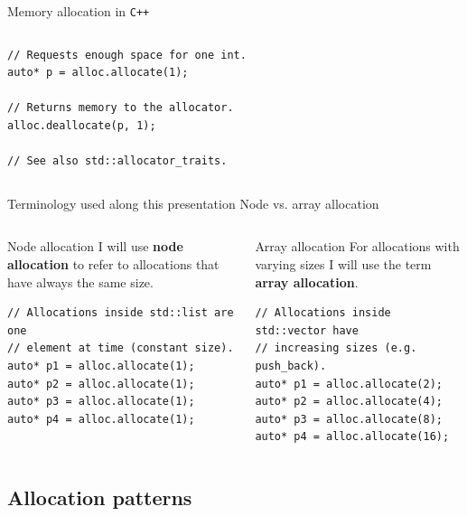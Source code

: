 \documentclass[10pt,aspectratio=169]{beamer}
\begin{document}
\begin{frame}[fragile]{Memory allocation in \texttt{C++}}
\begin{columns}
\begin{column}[t]{0.45\textwidth}
\begin{lstlisting}
// Requests enough space for one int.
auto* p = alloc.allocate(1);

// Returns memory to the allocator.
alloc.deallocate(p, 1);

// See also std::allocator_traits.
\end{lstlisting}
\end{column}
\end{columns}
\end{frame}

\begin{frame}[fragile]
{Terminology used along this presentation}
{Node vs. array allocation}
\begin{columns}
\begin{column}{0.45\textwidth}

\begin{block} {Node allocation}
I will use {\bf \color{alertc} node allocation} to refer to
allocations that have always the same size.
\end{block}
\vspace{0.5cm}
\begin{lstlisting}
// Allocations inside std::list are one
// element at time (constant size).
auto* p1 = alloc.allocate(1);
auto* p2 = alloc.allocate(1);
auto* p3 = alloc.allocate(1);
auto* p4 = alloc.allocate(1);
\end{lstlisting}

\end{column}

\begin{column}{0.45\textwidth}
\begin{block} {Array allocation}
For allocations with varying sizes I will use the term {\bf \color{alertc} array allocation}.
\end{block}
\vspace{0.5cm}
\begin{lstlisting}
// Allocations inside std::vector have
// increasing sizes (e.g. push_back).
auto* p1 = alloc.allocate(2);
auto* p2 = alloc.allocate(4);
auto* p3 = alloc.allocate(8);
auto* p4 = alloc.allocate(16);
\end{lstlisting}
\end{column}
\end{columns}
\end{frame}

\subsection{Allocation patterns}
\end{document}
